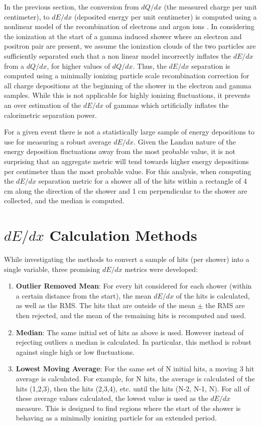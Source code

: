 In the previous section, the conversion from $dQ/dx$ (the measured charge per unit centimeter), to $dE/dx$ (deposited energy per unit centimeter) is computed using a nonlinear model of the recombination of electrons and argon ions \cite{Birks, Acciarri:2013met}.  In considering the ionization at the start of a gamma induced shower where an electron and positron pair are present, we assume the ionization clouds of the two particles are sufficiently separated such that a non linear model incorrectly inflates the $dE/dx$ from a $dQ/dx$, for higher values of $dQ/dx$.  Thus, the $dE/dx$ separation is computed using a minimally ionizing particle scale recombination correction for all charge depositions at the beginning of the shower in the electron and gamma samples.  While this is not applicable for highly ionizing fluctuations, it prevents an over estimation of the $dE/dx$ of gammas which artificially inflates the calorimetric separation power. 

For a given event there is not a statistically large sample of energy depositions to use for measuring a robust average $dE/dx$.  Given the Landau nature of the energy deposition fluctuations away from the most probable value, it is not surprising that an aggregate metric will tend towards higher energy depositions per centimeter than the most probable value.   For this analysis, when computing the $dE/dx$ separation metric for a shower all of the hits within a rectangle of 4 cm along the direction of the shower and 1 cm perpendicular to the shower are collected, and the median is computed.

\section{\label{sec:dedx_calcs} $dE/dx$ Calculation Methods}

While investigating the methods to convert a sample of hits (per shower) into a single variable, three promising $dE/dx$ metrics were developed:
\begin{enumerate}
  \item {\bf Outlier Removed Mean}: For every hit considered for each shower (within a certain distance from the start), the mean $dE/dx$ of the hits is calculated, as well as the RMS.  The hits that are outside of the mean $\pm$ the RMS are then rejected, and the mean of the remaining hits is recomputed and used.
  \item {\bf Median}: The same initial set of hits as above is used.  However instead of rejecting outliers a median is calculated.  In particular, this method is robust against single high or low fluctuations.
  \item {\bf Lowest Moving Average}: For the same set of N initial hits, a moving 3 hit average is calculated.  For example, for N hits, the average is calculated of the hits (1,2,3), then the hits (2,3,4), etc. until the hits (N-2, N-1, N).  For all of these average values calculated, the lowest value is used as the $dE/dx$ measure.  This is designed to find regions where the start of the shower is behaving as a minimally ionizing particle for an extended period.
\end{enumerate}

